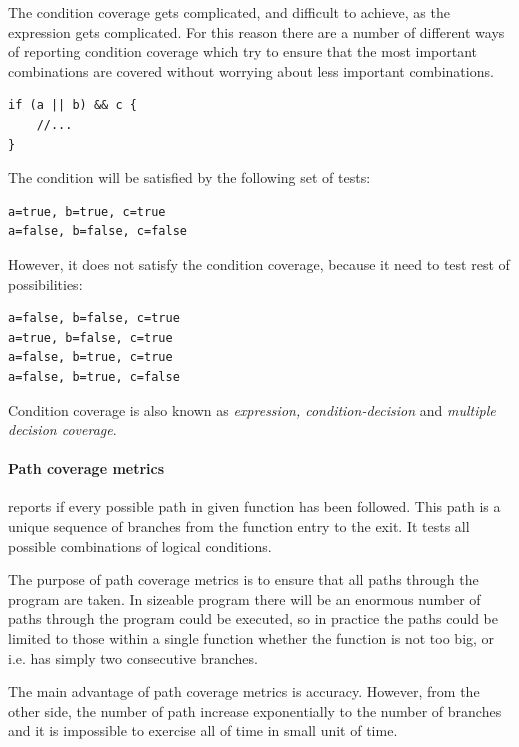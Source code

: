 The condition coverage gets complicated, and difficult to achieve, as the expression gets complicated. For this reason there are a number of different ways of reporting condition coverage which try to ensure that the most important combinations are covered without worrying about less important combinations.

\begin{lstlisting}[caption=Complex conditional coverage, label=lst:conditional2]
if (a || b) && c {
	//...
}
\end{lstlisting}

The condition will be satisfied by the following set of tests:
\begin{verbatim} 
a=true, b=true, c=true
a=false, b=false, c=false
\end{verbatim} 

However, it does not satisfy the condition coverage, because it need to test rest of possibilities:
\begin{verbatim}
a=false, b=false, c=true
a=true, b=false, c=true
a=false, b=true, c=true
a=false, b=true, c=false
\end{verbatim}

Condition coverage is also known as \textit{expression, condition-decision} and \textit{multiple decision coverage}.
\paragraph{Path coverage metrics} reports if every possible path in given function has been followed. This path is a unique sequence of branches from the function entry to the exit. It tests all possible combinations of logical conditions. 

The purpose of path coverage metrics is to ensure that all paths through the program are taken. In sizeable program there will be an enormous number of paths through the program could be executed, so in practice the paths could be limited to those within a single function whether the function is not too big, or i.e. has simply two consecutive branches.

The main advantage of path coverage metrics is accuracy. However, from the other side, the number of path increase exponentially to the number of branches and it is impossible to exercise all of time in small unit of time.  

